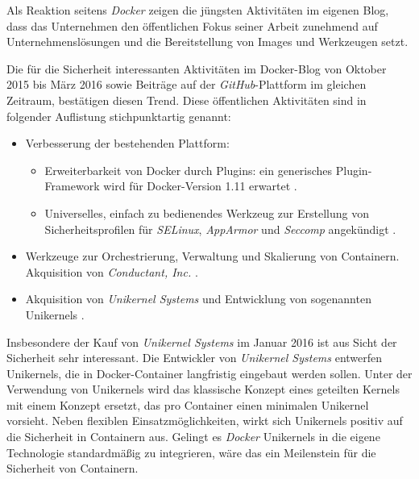 \documentclass[../main.tex]{subfiles}
\begin{document}
  Als Reaktion seitens \emph{Docker} zeigen die jüngsten Aktivitäten im eigenen Blog, dass das Unternehmen den öffentlichen Fokus seiner Arbeit zunehmend auf Unternehmenslösungen und die Bereitstellung von Images und Werkzeugen setzt.

  Die für die Sicherheit interessanten Aktivitäten im Docker-Blog von Oktober 2015 bis März 2016 sowie Beiträge auf der \emph{GitHub}-Plattform im gleichen Zeitraum, bestätigen diesen Trend. Diese öffentlichen Aktivitäten sind in folgender Auflistung stichpunktartig genannt:

  \begin{itemize}
    \item Verbesserung der bestehenden Plattform:
      \begin{itemize}
        \item Erweiterbarkeit von Docker durch Plugins: ein generisches Plugin-Framework wird für Docker-Version 1.11 erwartet \cite{githubDockerRoadmap}\cite{githubAuthZPluginInfrastructure}.
        \item Universelles, einfach zu bedienendes Werkzeug zur Erstellung von Sicherheitsprofilen für \emph{SELinux}, \emph{AppArmor} und \emph{Seccomp} angekündigt \cite{githubGeneralSecProfiles}.
      \end{itemize}
    \item Werkzeuge zur Orchestrierung, Verwaltung und Skalierung von Containern. Ak­qui­si­ti­on von \emph{Conductant, Inc.} \cite{dockerAurora}.
    \item Ak­qui­si­ti­on von \emph{Unikernel Systems} und Entwicklung von sogenannten Unikernels \cite{dockerUnikernel}.
  \end{itemize}

  Insbesondere der Kauf von \emph{Unikernel Systems} im Januar 2016 ist aus Sicht der Sicherheit sehr interessant. Die Entwickler von \emph{Unikernel Systems} entwerfen Unikernels, die in Docker-Container langfristig eingebaut werden sollen. Unter der Verwendung von Unikernels wird das klassische Konzept eines geteilten Kernels mit einem Konzept ersetzt, das pro Container einen minimalen Unikernel vorsieht. Neben flexiblen Einsatzmöglichkeiten, wirkt sich Unikernels positiv auf die Sicherheit in Containern aus. Gelingt es \emph{Docker} Unikernels in die eigene Technologie standardmäßig zu integrieren, wäre das ein Meilenstein für die Sicherheit von Containern.
\end{document}

